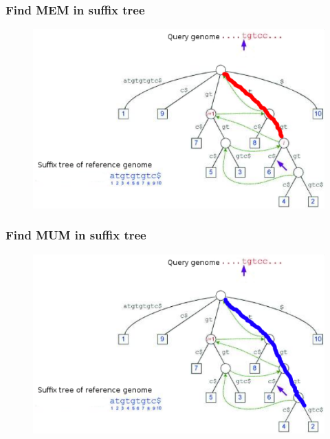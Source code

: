 \documentclass{beamer}
\begin{document}
\begin{frame}
  \frametitle{Find MEM in suffix tree}
  \begin{figure}\includegraphics[scale=0.8]{mem.png}\end{figure}
\end{frame}
\begin{frame}
  \frametitle{Find MUM in suffix tree}
  \begin{figure}\includegraphics[scale=0.8]{mum.png}\end{figure}
\end{frame}
\end{document}
